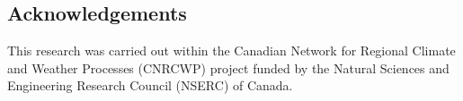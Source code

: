 \documentclass[a0,landscape]{a0poster}
\begin{document}
\begin{multicols*}{4}
\color{DarkSlateGray} %



\nocite{*} %
\small

\section*{Acknowledgements}
\small
This research was carried out within the Canadian Network for Regional Climate and Weather Processes (CNRCWP) project funded by the Natural Sciences and Engineering Research Council (NSERC) of Canada.

\end{multicols*}
\end{document}
